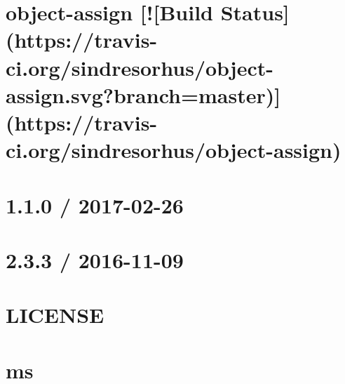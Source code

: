 \documentclass[twoside]{book}
\newcommand{\+}{\discretionary{\mbox{\scriptsize$\hookleftarrow$}}{}{}}
\begin{document}
\chapter{object-\/assign \mbox{[}!\mbox{[}Build Status\mbox{]}(https\+://travis-\/ci.org/sindresorhus/object-\/assign.svg?branch=master)\mbox{]}(https\+://travis-\/ci.org/sindresorhus/object-\/assign)}
\label{md_bin_node_modules_socket_8io_node_modules_object-assign_readme}

\chapter{1.1.0 / 2017-\/02-\/26}
\label{md_bin_node_modules_socket_8io_node_modules_socket_8io-adapter__history}

\chapter{2.3.3 / 2016-\/11-\/09}
\label{md_bin_node_modules_socket_8io_node_modules_socket_8io-adapter_node_modules_debug__c_h_a_n_g_e_l_o_g}

\chapter{L\+I\+C\+E\+N\+SE}
\label{md_bin_node_modules_socket_8io_node_modules_socket_8io-adapter_node_modules_debug_node_modules_ms__l_i_c_e_n_s_e}

\chapter{ms}
\label{md_bin_node_modules_socket_8io_node_modules_socket_8io-adapter_node_modules_debug_node_modules_ms__r_e_a_d_m_e}

\end{document}
